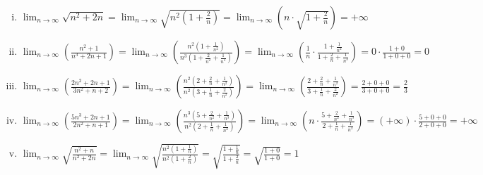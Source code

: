 \begin{example}
\item {}
  \begin{enumerate}[i)]
    \item $ \displaystyle 
      \lim_{n \to \infty} \sqrt{n^{2}+2n} = \lim_{n \to \infty} \sqrt{n^{2}\left(1+ 
      \frac{2}{n}\right)} = \lim_{n \to \infty} 
      \left(n \cdot \sqrt{1+ \frac{2}{n}}\right) = +\infty 
      $
    \item $\displaystyle
      \lim_{n \to \infty} \left(\frac{n^{2}+1}{n^{3}+2n+1}\right) = \lim_{n \to \infty}
      \left(\frac{n^{2}(1+ \frac{1}{n^{2}})}{n^{3}(1+ \frac{2}{n^{2}} + 
      \frac{1}{n^{3}})}\right)
      = \lim_{n \to \infty} \left(\frac{1}{n} \cdot \frac{1+ \frac{1}{n^{2}}}{1 +
      \frac{2}{n} + \frac{1}{n^{3}}}\right) = 0 \cdot \frac{1 + 0}{1+0+0} = 0 $

    \item $ \displaystyle
      \lim_{n \to \infty} \left(\frac{2n^{2}+2n+1}{3n^{2}+n+2}\right) = 
      \lim_{n \to \infty}
      \left(\frac{n^{2}(2+ \frac{2}{n} + \frac{1}{n^{2}})}{n^{2}(3+ \frac{1}{n} +
        \frac{2}{n^{2}})}\right) = \lim_{n \to \infty} \left(\frac{2+ \frac{2}{n} +
      \frac{1}{n^{2}}}{3+ \frac{1}{n} + \frac{2}{n^{2}}}\right) = \frac{2+0+0}{3+0+0} 
      = \frac{2}{3} $

    \item $ \displaystyle
      \lim_{n \to \infty} \left(\frac{5n^{3}+2n+1}{2n^{2}+n+1}\right) = 
      \lim_{n \to \infty}
      \left(\frac{n^{3}(5+ \frac{2}{n^{2}} + \frac{1}{n^{3}})}{n^{2}(2+ \frac{1}{n} +
        \frac{1}{n^{2}})}\right) = \lim_{n \to \infty} \left(n \cdot \frac{5 + 
      \frac{2}{n^{2}} + \frac{1}{n^{3}}}{2+ \frac{1}{n} + \frac{1}{n^{2}}}\right) = 
      (+\infty)\cdot \frac{5+0+0}{2+0+0} = + \infty $

    \item $ \displaystyle
      \lim_{n \to \infty} \sqrt{\frac{n^{2}+n}{n^{2}+2n}} = \lim_{n \to \infty}
      \sqrt{\frac{n^{2}(1+ \frac{1}{n})}{n^{2}(1+ \frac{2}{n})}} =
      \sqrt{\frac{1+ \frac{1}{n}}{1+ \frac{2}{n}}} = \sqrt{\frac{1+0}{1+0}} = 1 $
  \end{enumerate}
\end{example}

